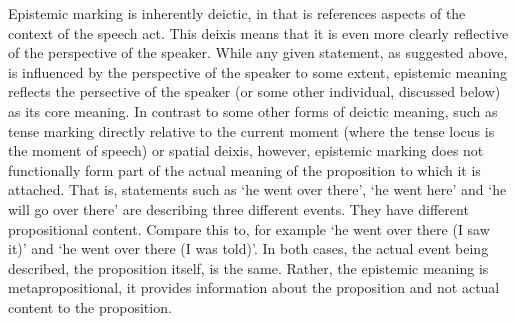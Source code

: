 Epistemic marking is inherently deictic, in that is references aspects of the context of the speech act. This deixis means that it is even more clearly reflective of the perspective of the speaker. While any given statement, as suggested above, is influenced by the perspective of the speaker to some extent, epistemic meaning reflects the persective of the speaker (or some other individual, discussed below) as its core meaning. In contrast to some other forms of deictic meaning, such as tense marking directly relative to the current moment (where the tense locus is the moment of speech) or spatial deixis, however, epistemic marking does not functionally form part of the actual meaning of the proposition to which it is attached. That is, statements such as `he went over there', `he went here' and `he will go over there' are describing three different events. They have different propositional content. Compare this to, for example `he went over there (I saw it)' and `he went over there (I was told)'. In both cases, the actual event being described, the proposition itself, is the same. Rather, the epistemic meaning is metapropositional, it provides information about the proposition and not actual content to the proposition.

